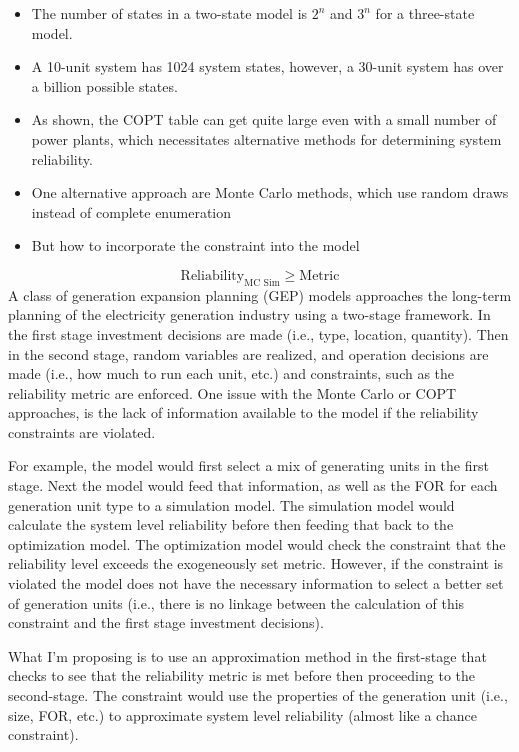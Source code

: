 \documentclass[10pt]{amsart}
\begin{document}
\begin{itemize}
\item The number of states in a two-state model is $2^n$ and $3^n$ for a three-state model. 
\item A 10-unit system has 1024 system states, however, a 30-unit system has over a billion possible states.
\item As shown, the COPT table can get quite large even with a small number of power plants, which necessitates alternative methods for determining system reliability.
\item One alternative approach are Monte Carlo methods, which use random draws instead of complete enumeration
\item But how to incorporate the constraint into the model
\end{itemize}

\begin{equation}
\text{Reliability}_{\text{MC Sim}} \geq \text{Metric}
\end{equation}
A class of generation expansion planning (GEP) models approaches the long-term planning of the electricity generation industry using a two-stage framework.
In the first stage investment decisions are made (i.e., type, location, quantity).
Then in the second stage, random variables are realized, and operation decisions are made (i.e., how much to run each unit, etc.) and constraints, such as the reliability metric are enforced.
One issue with the Monte Carlo or COPT approaches, is the lack of information available to the model if the reliability constraints are violated.

For example, the model would first select a mix of generating units in the first stage. 
Next the model would feed that information, as well as the FOR for each generation unit type to a simulation model.
The simulation model would calculate the system level reliability before then feeding that back to the optimization model. 
The optimization model would check the constraint that the reliability level exceeds the exogeneously set metric.
However, if the constraint is violated the model does not have the necessary information to select a better set of generation units (i.e., there is no linkage between the calculation of this constraint and the first stage investment decisions).

What I'm proposing is to use an approximation method in the first-stage that checks to see that the reliability metric is met before then proceeding to the second-stage.
The constraint would use the properties of the generation unit (i.e., size, FOR, etc.) to approximate system level reliability (almost like a chance constraint).
\end{document}
